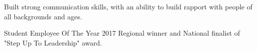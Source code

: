 \begin{tightemize}
  \item Built strong communication skills, with an ability to build rapport with people of all backgrounds and ages.
  \item Student Employee Of The Year 2017 Regional winner and National finalist of "Step Up To Leadership" award.
\end{tightemize}
\sectionsep{}
